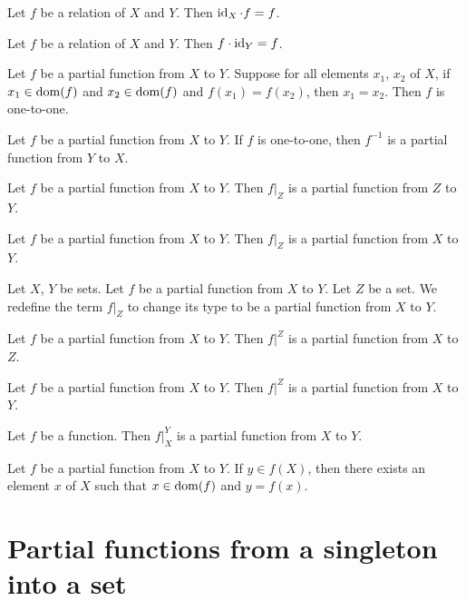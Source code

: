 \documentclass{article}
\begin{document}
\begin{thm}
\item\label{partfun1:6} Let $f$ be a relation of $X$ and $Y$. Then
  $\operatorname{id}_{X}\cdot f=f$.
\item\label{partfun1:7} Let $f$ be a relation of $X$ and $Y$. Then
  $f\cdot\operatorname{id}_{Y}=f$.
\item\label{partfun1:8} Let $f$ be a partial function from $X$ to $Y$.
  Suppose for all elements $x_{1}$, $x_{2}$ of $X$, if $x_{1}\in\operatorname{dom}(f)$
  and $x_{2}\in\operatorname{dom}(f)$ and $f(x_{1})=f(x_{2})$, then $x_{1}=x_{2}$.
  Then $f$ is one-to-one.
\item\label{partfun1:9} Let $f$ be a partial function from $X$ to $Y$.
  If $f$ is one-to-one, then $f^{-1}$ is a partial function from $Y$ to $X$.
\item\label{partfun1:10}  Let $f$ be a partial function from $X$ to $Y$.
  Then $f|_{Z}$ is a partial function from $Z$ to $Y$.
\item\label{partfun1:11} Let $f$ be a partial function from $X$ to $Y$.
  Then $f|_{Z}$ is a partial function from $X$ to $Y$.
\end{thm}

\begin{definition}
Let $X$, $Y$ be sets. Let $f$ be a partial function from $X$ to $Y$.
Let $Z$ be a set.
We redefine the term $f|_{Z}$ to change its type to be a partial
function from $X$ to $Y$.
\end{definition}

\begin{thm}
\item\label{partfun1:12} Let $f$ be a partial function from $X$ to $Y$.
  Then $f|^{Z}$ is a partial function from $X$ to $Z$.
\item\label{partfun1:13} Let $f$ be a partial function from $X$ to $Y$.
  Then $f|^{Z}$ is a partial function from $X$ to $Y$.
\item\label{partfun1:14} Let $f$ be a function.
  Then $f|^{Y}_{X}$ is a partial function from $X$ to $Y$.
\item\label{partfun1:15} Let $f$ be a partial function from $X$ to $Y$.
  If $y\in f(X)$, then there exists an element $x$ of $X$ such that
  $x\in\operatorname{dom}(f)$ and $y=f(x)$.
\end{thm}

\section{Partial functions from a singleton into a set}
\end{document}
